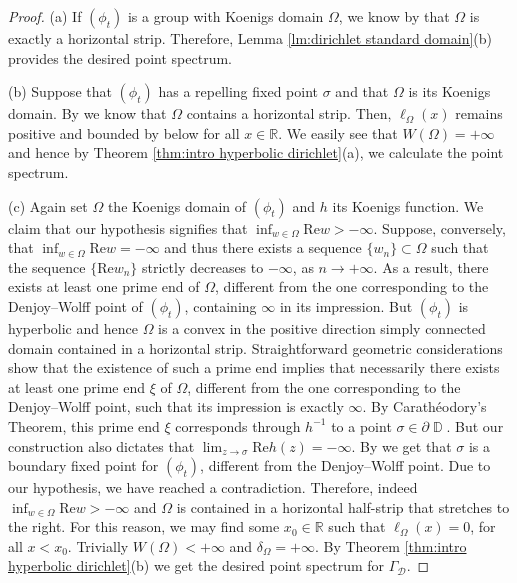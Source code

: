\documentclass[11pt]{amsart}
\numberwithin{equation}{section}
\theoremstyle{definition}
\DeclareMathOperator{\D}{\mathbb{D}}
\begin{document}
	\begin{proof}
		(a) If $(\phi_t)$ is a group with Koenigs domain $\Omega$, we know by \cite[Proposition 9.3.12]{Booksem} that $\Omega$ is exactly a horizontal strip. Therefore, Lemma \ref{lm:dirichlet standard domain}(b) provides the desired point spectrum.
		
		(b) Suppose that $(\phi_t)$ has a repelling fixed point $\sigma$ and that $\Omega$ is its Koenigs domain. By \cite[Theorem 13.5.5]{Booksem} we know that $\Omega$ contains a horizontal strip. Then, $\ell_\Omega(x)$ remains positive and bounded by below for all $x\in\mathbb{R}$. We easily see that $W(\Omega)=+\infty$ and hence by Theorem \ref{thm:intro hyperbolic dirichlet}(a), we calculate the point spectrum.
		
		(c) Again set $\Omega$ the Koenigs domain of $(\phi_t)$ and $h$ its Koenigs function. We claim that our hypothesis signifies that $\inf_{w\in\Omega}\mathrm{Re}w>-\infty$. Suppose, conversely, that $\inf_{w\in\Omega}\mathrm{Re}w=-\infty$ and thus there exists a sequence $\{w_n\}\subset\Omega$ such that the sequence $\{\mathrm{Re}w_n\}$ strictly decreases to $-\infty$, as $n\to+\infty$. As a result, there exists at least one prime end of $\Omega$, different from the one corresponding to the Denjoy--Wolff point of $(\phi_t)$, containing $\infty$ in its impression. But $(\phi_t)$ is hyperbolic and hence $\Omega$ is a convex in the positive direction simply connected domain contained in a horizontal strip. Straightforward geometric considerations show that the existence of such a prime end implies that necessarily there exists at least one prime end $\xi$ of $\Omega$, different from the one corresponding to the Denjoy--Wolff point, such that its impression is exactly $\infty$. By Carath\'{e}odory's Theorem, this prime end $\xi$ corresponds through $h^{-1}$ to a point $\sigma\in\partial\D$. But our construction also dictates that $\lim_{z\to\sigma}\mathrm{Re}h(z)=-\infty$. By \cite[Proposition 13.6.2]{Booksem} we get that $\sigma$ is a boundary fixed point for $(\phi_t)$, different from the Denjoy--Wolff point. Due to our hypothesis, we have reached a contradiction. Therefore, indeed $\inf_{w\in\Omega}\mathrm{Re}w>-\infty$ and $\Omega$ is contained in a horizontal half-strip that stretches to the right. For this reason, we may find some $x_0\in\mathbb{R}$ such that $\ell_\Omega(x)=0$, for all $x<x_0$. Trivially $W(\Omega)<+\infty$ and $\delta_\Omega=+\infty$. By Theorem \ref{thm:intro hyperbolic dirichlet}(b) we get the desired point spectrum for $\Gamma_\mathcal{D}$.
	\end{proof}
	
\end{document}
